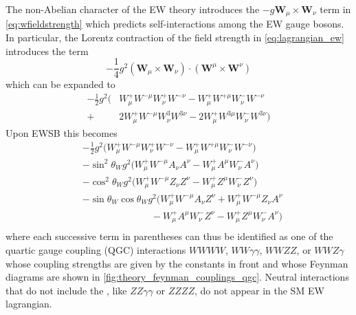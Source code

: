 The non-Abelian character of the 
EW theory introduces the $-g\textbf{W}_{\mu} \times \textbf{W}_{\nu}$
term in \eqref{eq:wfieldstrength}
which predicts self-interactions
among the EW gauge bosons. 
In particular, the Lorentz contraction of the field strength 
in \eqn\eqref{eq:lagrangian_ew}
introduces the term 
\begin{equation}
-\frac{1}{4} g^2 (\textbf{W}_{\mu} \times \textbf{W}_{\nu}) \cdot
                 (\textbf{W}^{\mu} \times \textbf{W}^{\nu}) 
\end{equation}
which can be expanded to 
\begin{equation}
\begin{aligned}
-\frac{1}{2} g^2 \Big( & W_{\mu}^+ W^{-\mu} W_{\nu}^+W^{-\nu}
                  -  W_{\mu}^+ W^{+\mu} W_{\nu}^- W^{-\nu} \\
		  + &2 W_{\mu}^+ W^{-\mu} W^{3}_{\nu}W^{3 \nu}
		  - 2 W_{\mu}^+ W^{3\mu} W_{\nu}^- W^{3 \nu}\Big)
\end{aligned}
\end{equation}
Upon EWSB this becomes
\begin{equation}
\begin{aligned}
&-\frac{1}{2} g^2 \Big(  W_{\mu}^+ W^{-\mu} W_{\nu}^+W^{-\nu}
                  -  W_{\mu}^+ W^{+\mu} W_{\nu}^- W^{-\nu} \Big) \\
&-\sin^2\theta_W g^2 \Big(  W_{\mu}^+ W^{-\mu} A_{\nu} A^{\nu}
                  -  W_{\mu}^+ A^{\mu} W_{\nu}^- A^{\nu} \Big)\\
&-\cos^2\theta_W g^2 \Big( W_{\mu}^+ W^{-\mu} Z_{\nu} Z^{\nu}
                  -  W_{\mu}^+ Z^{\mu} W_{\nu}^- Z^{\nu} \Big)\\
&-\sin\theta_W\cos\theta_W g^2 \Big( W_{\mu}^+ W^{-\mu} A_{\nu} Z^{\nu}
                  +W_{\mu}^+W^{-\mu} Z_{\nu} A^{\nu}\\
		  &\hspace{3cm}- W_{\mu}^+ A^{\mu} W_{\nu}^- Z^{\nu}
		  - W_{\mu}^+ Z^{\mu} W_{\nu}^- A^{\nu}\Big)\\
\end{aligned}
\label{eq:lagrangian_qgc}
\end{equation}
where each successive term in parentheses  
can thus be identified as one of the quartic gauge coupling
(QGC) interactions $WWWW$, $WW\gamma\gamma$, $WWZZ$, or $WWZ\gamma$
whose coupling strengths are given by the constants in front and
whose Feynman diagrams 
are shown in \fig\ref{fig:theory_feynman_couplings_qgc}.
Neutral interactions that do not 
include the \dubya, like $ZZ\gamma\gamma$ or $ZZZZ$,
do not appear in the SM EW lagrangian.





